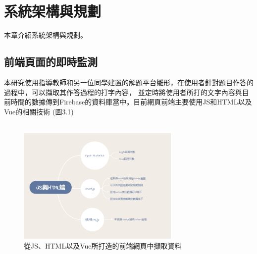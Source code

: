 \chapter{系統架構與規劃}

\lstset{style=mystyle}
本章介紹系統架構與規劃。

\section{前端頁面的即時監測} 
本研究使用指導教師和另一位同學建置的解題平台雛形，在使用者針對題目作答的過程中，可以擷取其作答過程的打字內容，
並定時將使用者所打的文字內容與目前時間的數據傳到Firebase的資料庫當中。目前網頁前端主要使用JS和HTML以及Vue的相關技術 (圖3.1)\\\\
\begin{figure}[H] %
		\centering %
		\includegraphics[width=0.7\textwidth]{1.png} %
		\caption{從JS、HTML以及Vue所打造的前端網頁中擷取資料} %
		\label{Fig.3.1} %
\end{figure}
